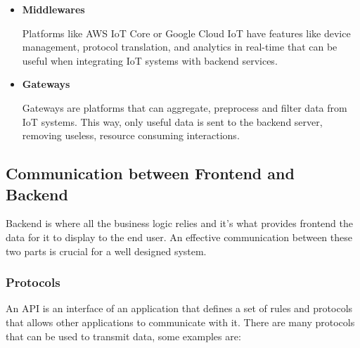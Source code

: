 \begin{itemize}

	\item \textbf{Middlewares}

	      Platforms like \gls{AWS} \gls{IoT} Core or Google Cloud \gls{IoT} have features like
	      device management, protocol translation, and analytics in real-time that
	      can be useful when integrating \gls{IoT} systems with backend services.

	\item \textbf{Gateways}

	      Gateways are platforms that can aggregate, preprocess and filter data
	      from \gls{IoT} systems. This way, only useful data is sent to the backend server,
	      removing useless, resource consuming interactions.

\end{itemize}

\subsection{Communication between Frontend and Backend}
Backend is where all the business logic relies and it's what provides frontend
the data for it to display to the end user. An effective communication between
these two parts is crucial for a well designed system.
\subsubsection{Protocols}
An \gls{API} is an interface of an application that defines a set of rules and
protocols that allows other applications to communicate with it. There are many
protocols that can be used to transmit data, some examples are:

